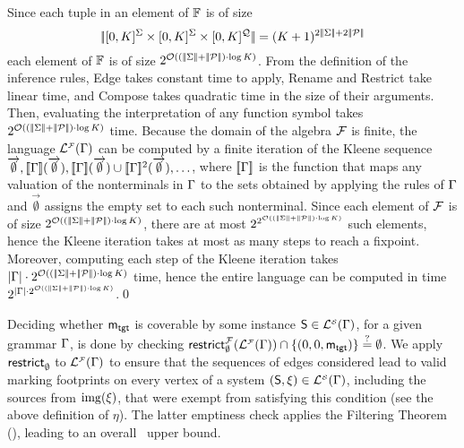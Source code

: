 \begin{proofE}
  Since each tuple in an element of $\mathbb{F}$ is of size
  \[|\!|{[0,K]^\Sigma \times [0,K]^\Sigma \times
    [0,K]^\mathcal{Q}}|\!| = (K+1)^{2|\!|{\Sigma}|\!| +
    2|\!|{\mathcal{P}}|\!|}\] each element of $\mathbb{F}$ is of size 
  $2^{\mathcal{O}((|\!|{\Sigma}|\!|+|\!|{\mathcal{P}}|\!|) \cdot \log K)}$.
  From the definition of the inference rules, Edge takes
  constant time to apply, Rename and Restrict take linear time, and
  Compose takes quadratic time in the size of their arguments. Then,
  evaluating the interpretation of any \hrtext{} function symbol takes
  $2^{\mathcal{O}((|\!|{\Sigma}|\!|+|\!|{\mathcal{P}}|\!|) \cdot \log K)}$
  time. Because the domain of the algebra $\mathcal{F}$ is
  finite, the language $\mathcal{L}_{}^{\scriptscriptstyle{\mathcal{F}}}({\Gamma})$ can be
  computed by a finite iteration of the Kleene sequence
  $\overrightarrow{\emptyset},
  [\![{\Gamma}]\!](\overrightarrow{\emptyset}),[\![{\Gamma}]\!](\overrightarrow{\emptyset})
  \cup [\![{\Gamma}]\!]^2(\overrightarrow{\emptyset}), \ldots$, where
  $[\![{\Gamma}]\!]$ is the function that maps any valuation of the
  nonterminals in $\Gamma$ to the sets obtained by applying the
  rules of $\Gamma$ and $\overrightarrow{\emptyset}$ assigns the
  empty set to each such nonterminal. Since each element of
  $\mathcal{F}$ is of size
  $2^{\mathcal{O}((|\!|{\Sigma}|\!|+|\!|{\mathcal{P}}|\!|) \cdot \log K)}$,
  there are at most
  $2^{2^{\mathcal{O}((|\!|{\Sigma}|\!|+|\!|{\mathcal{P}}|\!|) \cdot \log
      K)}}$ such elements, hence the Kleene iteration takes at most as
  many steps to reach a fixpoint. Moreover, computing each step of the
  Kleene iteration takes $|{\Gamma}| \cdot
  2^{\mathcal{O}((|\!|{\Sigma}|\!|+|\!|{\mathcal{P}}|\!|) \cdot \log K)}$
  time, hence the entire language can be computed in time
  $2^{|{\Gamma}| \cdot
    2^{\mathcal{O}((|\!|{\Sigma}|\!|+|\!|{\mathcal{P}}|\!|) \cdot \log
      K)}}$.\qed
\end{proofE}

\noindent Deciding whether $\mathsf{m}_\mathsf{tgt}$ is coverable by some instance
$\mathsf{S} \in \mathcal{L}_{}^{\scriptscriptstyle{\mathcal{S}}}({\Gamma})$, for a given \hrtext{}
grammar $\Gamma$, is done by checking
$\mathsf{restrict}^{\mathcal{F}}_{{\emptyset}}(\mathcal{L}_{}^{\scriptscriptstyle{\mathcal{F}}}({\Gamma})) \cap
{\{ {(0,0,\mathsf{m}_\mathsf{tgt})} \}} \stackrel{?}{=} \emptyset$. We apply
$\mathsf{restrict}^{}_{{\emptyset}}$ to $\mathcal{L}_{}^{\scriptscriptstyle{\mathcal{F}}}({\Gamma})$ to
ensure that the sequences of edges considered lead to valid marking
footprints on every vertex of a system $(\mathsf{S},\xi) \in
\mathcal{L}_{}^{\scriptscriptstyle{\mathcal{S}}}({\Gamma})$, including the sources from
${\mathrm{img}({\xi})}$, that were exempt from satisfying this condition (see
the above definition of $\eta$). The latter emptiness check applies
the Filtering Theorem (), leading to an overall
\twoexptime\ upper bound.


